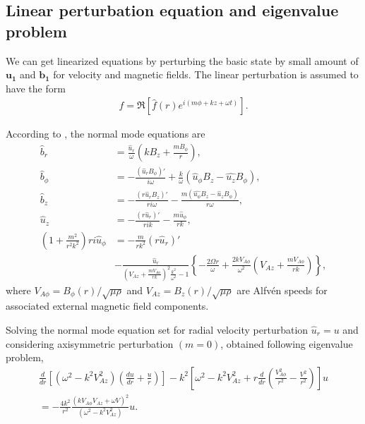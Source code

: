 \documentclass{jfm}
\begin{document}
%
%
\subsection{Linear perturbation equation and eigenvalue problem}

We can get linearized equations by perturbing the basic state by small amount
of $\mathbf{u_1}$ and $\mathbf{b_1}$ for velocity and magnetic fields. The
linear perturbation is assumed to have the form
\begin{align}
    f=\Re\left[\hat{f}(r)e^{i(m\phi+kz+\omega t)} \right].
\end{align}

According to \cite{Acheson1972}, the normal mode equations are
\begin{align}
    \hat{b}_r &=\frac{\hat{u}_r}{\omega}\left(k B_z +\frac{m B_\phi}{r}\right) , \\
    \hat{b}_\phi &= -\frac{(\hat{u}_r B_\phi)'}{i\omega} +\frac{k}{\omega}(\hat{u}_\phi B_z -\hat{u_z}B_\phi) , \\
    \hat{b}_z &= -\frac{(r\hat{u}_r B_z)'}{ri\omega} - \frac{m(\hat{u_\phi} B_z - \hat{u}_z B_\phi)}{r\omega} , \\
    \hat{u}_z &= -\frac{(r\hat{u}_r)'}{rik}-\frac{m\hat{u}_\phi}{rk} , \\
    \left(1+\frac{m^2}{r^2k^2}\right)ri\hat{u}_\phi &= -\frac{m}{rk^2}(r\hat{u}_r)' \nonumber \\ &-\frac{\hat{u}_r}{\left(V_{Az}+\frac{m V_{A\phi}}{rk}\right)^2\frac{k^2}{\omega^2}-1}
    \left\{-\frac{2\Omega r}{\omega}+\frac{2kV_{A\phi}}{\omega^2}\left(V_{Az}+\frac{mV_{A\phi}}{rk}\right)\right\} ,
\end{align}
where $V_{A\phi}=B_\phi (r) / \sqrt{\mu \rho}$ and  $V_{Az}=B_z (r) / \sqrt{\mu \rho}$ 
are Alfv\'en speeds for associated external magnetic field components.

Solving the normal mode equation set for radial velocity perturbation 
$\hat{u}_r = u$ and considering axisymmetric perturbation $(m=0)$, 
\cite{Acheson1973a} obtained following eigenvalue problem,
\begin{align}
    \frac{d}{dr}\left[(\omega^2-k^2 V_{Az}^2)\left(\frac{du}{dr}+\frac{u}{r}\right)\right]-k^2\left[\omega^2-k^2 V_{Az}^2+r\frac{d}{dr}\left(\frac{V_{A\phi}^2}{r^2}-\frac{V^2}{r^2}\right)\right]u \nonumber \\
    = -\frac{4 k^2}{r^2}\frac{(k V_{A\phi} V_{Az}+\omega V)^2}{(\omega^2-k^2 V_{Az}^2)} u.
\end{align}
\end{document}

